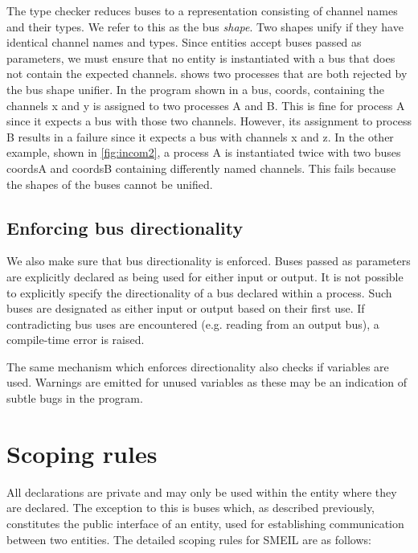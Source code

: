 The type checker reduces buses to a representation consisting of channel names
and their types. We refer to this as the bus {\itshape shape}. Two shapes unify
if they have identical channel names and types. Since entities accept buses
passed as parameters, we must ensure that no entity is instantiated with a
bus that does not contain the expected channels.  shows two
processes that are both rejected by the bus shape unifier. In the program shown
in  a bus, {\ttfamily coords}, containing the channels
{\ttfamily x} and {\ttfamily y} is assigned to two processes {\ttfamily A} and
{\ttfamily B}. This is fine for process {\ttfamily A} since it expects a bus
with those two channels. However, its assignment to process {\ttfamily B}
results in a failure since it expects a bus with channels {\ttfamily x} and
{\ttfamily z}. In the other example, shown in \cref{fig:incom2}, a process
{\ttfamily A} is instantiated twice with two buses {\ttfamily coordsA} and
{\ttfamily coordsB} containing differently named channels. This fails because
the shapes of the buses cannot be unified.


\subsection{Enforcing bus directionality}
We also make sure that bus directionality is enforced. Buses passed as
parameters are explicitly declared as being used for either input or output. It
is not possible to explicitly specify the directionality of a bus declared
within a process. Such buses are designated as either input or output based on
their first use. If contradicting bus uses are encountered (e.g. reading from an
output bus), a compile-time error is raised.

The same mechanism which enforces directionality also checks if variables are
used. Warnings are emitted for unused variables as these may be an indication of
subtle bugs in the program.

\section{Scoping rules}
All declarations are private and may only be used within the entity where they
are declared. The exception to this is buses which, as described previously,
constitutes the public interface of an entity, used for establishing
communication between two entities.
The detailed scoping rules for SMEIL are as follows:


